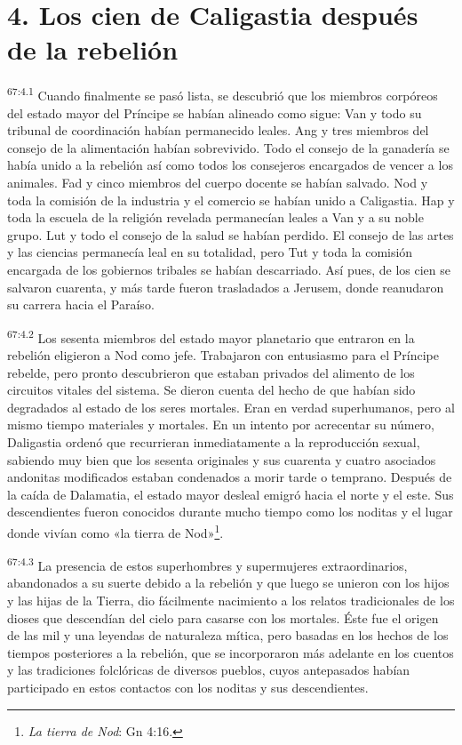 \section*{4. Los cien de Caligastia después de la rebelión}
\par
\textsuperscript{67:4.1} Cuando finalmente se pasó lista, se descubrió que los miembros corpóreos del estado mayor del Príncipe se habían alineado como sigue: Van y todo su tribunal de coordinación habían permanecido leales. Ang y tres miembros del consejo de la alimentación habían sobrevivido. Todo el consejo de la ganadería se había unido a la rebelión así como todos los consejeros encargados de vencer a los animales. Fad y cinco miembros del cuerpo docente se habían salvado. Nod y toda la comisión de la industria y el comercio se habían unido a Caligastia. Hap y toda la escuela de la religión revelada permanecían leales a Van y a su noble grupo. Lut y todo el consejo de la salud se habían perdido. El consejo de las artes y las ciencias permanecía leal en su totalidad, pero Tut y toda la comisión encargada de los gobiernos tribales se habían descarriado. Así pues, de los cien se salvaron cuarenta, y más tarde fueron trasladados a Jerusem, donde reanudaron su carrera hacia el Paraíso.

\par
\textsuperscript{67:4.2} Los sesenta miembros del estado mayor planetario que entraron en la rebelión eligieron a Nod como jefe. Trabajaron con entusiasmo para el Príncipe rebelde, pero pronto descubrieron que estaban privados del alimento de los circuitos vitales del sistema. Se dieron cuenta del hecho de que habían sido degradados al estado de los seres mortales. Eran en verdad superhumanos, pero al mismo tiempo materiales y mortales. En un intento por acrecentar su número, Daligastia ordenó que recurrieran inmediatamente a la reproducción sexual, sabiendo muy bien que los sesenta originales y sus cuarenta y cuatro asociados andonitas modificados estaban condenados a morir tarde o temprano. Después de la caída de Dalamatia, el estado mayor desleal emigró hacia el norte y el este. Sus descendientes fueron conocidos durante mucho tiempo como los noditas y el lugar donde vivían como «la tierra de Nod»\footnote{\textit{La tierra de Nod}: Gn 4:16.}.

\par
\textsuperscript{67:4.3} La presencia de estos superhombres y supermujeres extraordinarios, abandonados a su suerte debido a la rebelión y que luego se unieron con los hijos y las hijas de la Tierra, dio fácilmente nacimiento a los relatos tradicionales de los dioses que descendían del cielo para casarse con los mortales. Éste fue el origen de las mil y una leyendas de naturaleza mítica, pero basadas en los hechos de los tiempos posteriores a la rebelión, que se incorporaron más adelante en los cuentos y las tradiciones folclóricas de diversos pueblos, cuyos antepasados habían participado en estos contactos con los noditas y sus descendientes.

